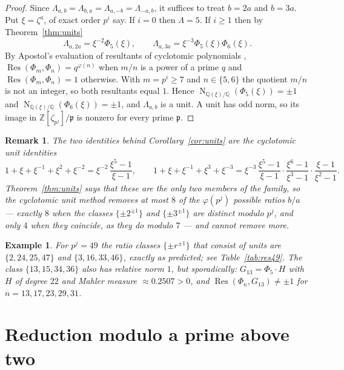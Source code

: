 \documentclass[a4paper]{article}
\newtheorem{remark}[theorem]{Remark}
\newtheorem{example}[theorem]{Example}
\newcommand{\Z}{\mathbb{Z}}
\newcommand{\Q}{\mathbb{Q}}
\DeclareMathOperator{\Res}{Res}
\DeclareMathOperator{\Nm}{N}
\begin{document}
\begin{proof}
	Since $\Lambda_{a,b}=\Lambda_{b,a}=\Lambda_{a,-b}=\Lambda_{-a,b}$, it
	suffices to treat $b=2a$ and $b=3a$.
	Put $\xi=\zeta^{a}$, of exact order $p^{i}$ say.
	If $i=0$ then $\Lambda=5$.
	If $i\geq1$ then by Theorem~\ref{thm:units}
	\[
		\Lambda_{a,2a}=\xi^{-2}\Phi_5(\xi),
		\qquad
		\Lambda_{a,3a}=\xi^{-3}\Phi_5(\xi)\Phi_6(\xi).
	\]
	By Apostol's evaluation of resultants of cyclotomic polynomials
	\cite{ApostolResultants}, $\Res(\Phi_m,\Phi_n)=q^{\varphi(n)}$ when
	$m/n$ is a power of a prime $q$ and $\Res(\Phi_m,\Phi_n)=1$ otherwise.
	With $m=p^{i}\geq7$ and $n\in\{5,6\}$ the quotient $m/n$ is not an
	integer, so both resultants equal $1$.
	Hence $\Nm_{\Q(\xi)/\Q}\!\left(\Phi_5(\xi)\right)=\pm1$ and
	$\Nm_{\Q(\xi)/\Q}\!\left(\Phi_6(\xi)\right)=\pm1$, and $\Lambda_{a,b}$
	is a unit.
	A unit has odd norm, so its image in $\Z[\zeta_{p^j}]/\mathfrak{p}$ is
	nonzero for every prime $\mathfrak{p}$.
\end{proof}

\begin{remark}
	The two identities behind Corollary~\ref{cor:units} are the cyclotomic
	unit identities
	\[
		1+\xi+\xi^{-1}+\xi^{2}+\xi^{-2}=\xi^{-2}\,\frac{\xi^{5}-1}{\xi-1},
		\qquad
		1+\xi+\xi^{-1}+\xi^{3}+\xi^{-3}
		=\xi^{-3}\,\frac{\xi^{5}-1}{\xi-1}\cdot\frac{\xi^{6}-1}{\xi^{3}-1}\cdot\frac{\xi-1}{\xi^{2}-1}.
	\]
	Theorem~\ref{thm:units} says that these are the only two members of the
	family, so the cyclotomic unit method removes at most $8$ of the
	$\varphi(p^j)$ possible ratios $b/a$ --- exactly $8$ when the classes
	$\{\pm2^{\pm1}\}$ and $\{\pm3^{\pm1}\}$ are distinct modulo $p^j$,
	and only $4$ when they coincide, as they do modulo $7$ --- and cannot
	remove more.
\end{remark}

\begin{example}
	For $p^j=49$ the ratio classes $\{\pm r^{\pm1}\}$ that consist of units
	are $\{2,24,25,47\}$ and $\{3,16,33,46\}$, exactly as predicted; see
	Table~\ref{tab:res49}.
	The class $\{13,15,34,36\}$ also has relative norm $1$, but
	sporadically: $G_{13}=\Phi_5\cdot H$ with $H$ of degree $22$ and
	Mahler measure $\approx0.2507>0$, and $\Res(\Phi_{n},G_{13})\ne\pm1$
	for $n=13,17,23,29,31$.
\end{example}

\section{Reduction modulo a prime above two}\label{sec:reduction}
\end{document}
